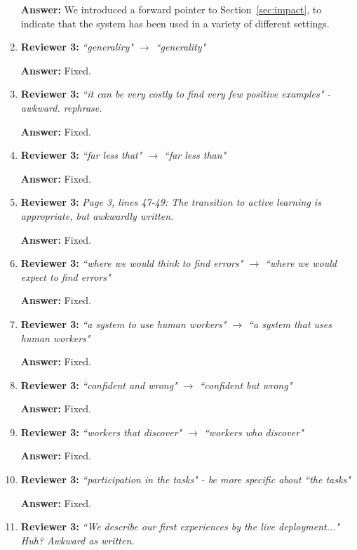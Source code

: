 \documentclass[letterpaper]{article}
\begin{document}
\begin{enumerate}
\textbf{Answer:} We introduced a forward pointer to Section~\ref{sec:impact}, to indicate that the system has been used in a variety of different settings.

\item \textbf{Reviewer 3:} \emph{ ``generaliry" $\rightarrow$ ``generality"}

\textbf{Answer:} Fixed.

\item \textbf{Reviewer 3:} \emph{ ``it can be very costly to find very few positive examples" - awkward. rephrase.}

\textbf{Answer:} Fixed.

\item \textbf{Reviewer 3:} \emph{ ``far less that" $\rightarrow$ ``far less than"}

\textbf{Answer:} Fixed.

\item \textbf{Reviewer 3:} \emph{ Page 3, lines 47-49: The transition to active learning is appropriate, but awkwardly written.}

\textbf{Answer:} Fixed.

\item \textbf{Reviewer 3:} \emph{ ``where we would think to find errors" $\rightarrow$ ``where we would expect to find errors"}

\textbf{Answer:} Fixed.

\item \textbf{Reviewer 3:} \emph{ ``a system to use human workers" $\rightarrow$ ``a system that uses human workers"}

\textbf{Answer:} Fixed.

\item \textbf{Reviewer 3:} \emph{ ``confident and wrong" $\rightarrow$ ``confident but wrong"}

\textbf{Answer:} Fixed.

\item \textbf{Reviewer 3:} \emph{ ``workers that discover" $\rightarrow$ ``workers who discover"}

\textbf{Answer:} Fixed.

\item \textbf{Reviewer 3:} \emph{ ``participation in the tasks" - be more specific about ``the tasks"}

\textbf{Answer:} Fixed.

\item \textbf{Reviewer 3:} \emph{ ``We describe our first experiences by the live deployment..." Huh?  Awkward as written.}


\end{enumerate}
\end{document}

